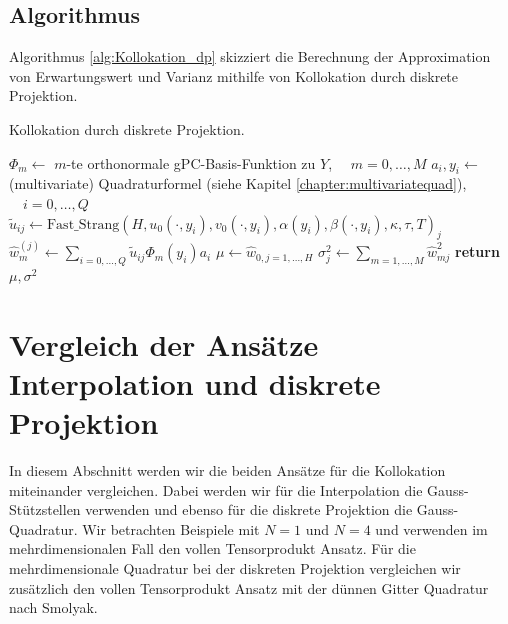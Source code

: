 \subsection{Algorithmus}
Algorithmus \ref{alg:Kollokation_dp} skizziert die Berechnung der Approximation von Erwartungswert und Varianz mithilfe von Kollokation durch diskrete Projektion.
\begin{algorithm}[ht]
    \caption{Kollokation durch diskrete Projektion.}
    \label{alg:Kollokation_dp}
    \begin{algorithmic}[1] %
            \State $\Phi_m\gets$ $m$-te orthonormale gPC-Basis-Funktion zu $Y$, $\quad m=0,\dots,M$
            \State $a_i, y_i\gets$ (multivariate) Quadraturformel (siehe Kapitel \ref{chapter:multivariatequad}), $\quad i=0,\dots,Q$
           		\State $\tilde{u}_{ij}\gets \text{Fast\_Strang}(H,u_0(\cdot, y_i),v_0(\cdot, y_i),\alpha(y_i),\beta(\cdot, y_i),\kappa,\tau,T)_j$
           	\EndFor
            \State $\hat{w}_m^{(j)}\gets \sum_{i=0,\dots,Q}\tilde{u}_{ij}\Phi_m(y_i)a_i$
			\State $\mu\gets \hat{w}_{0,j=1,\dots,H}$ 
			\State $\sigma^2_j\gets \sum_{m=1,\dots,M}\hat{w}^2_{mj}$
			\State \textbf{return} $\mu,\sigma^2$         
        \EndFunction
    \end{algorithmic}
\end{algorithm}
\section{Vergleich der Ansätze Interpolation und diskrete Projektion}
In diesem Abschnitt werden wir die beiden Ansätze für die Kollokation miteinander vergleichen. Dabei werden wir für die Interpolation die Gauss-Stützstellen verwenden und ebenso für die diskrete Projektion die Gauss-Quadratur. Wir betrachten Beispiele mit $N=1$ und $N=4$ und verwenden im mehrdimensionalen Fall den vollen Tensorprodukt Ansatz. Für die mehrdimensionale Quadratur bei der diskreten Projektion vergleichen wir zusätzlich den vollen Tensorprodukt Ansatz mit der dünnen Gitter Quadratur nach Smolyak.
